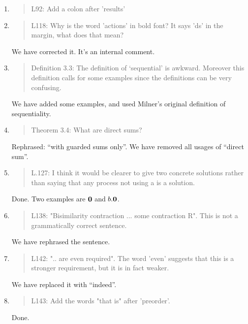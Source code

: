 \begin{enumerate}
\item \begin{quote}
    L92: Add a colon after 'results'
  \end{quote}

\item \begin{quote}
    L118: Why is the word 'actions' in bold font? It says 'ds' in the margin, what does that mean?
  \end{quote}
  We have corrected it. It's an internal comment.
  
\item \begin{quote}
Definition 3.3: The definition of ‘sequential’ is awkward.  Moreover
this definition calls for some examples since the definitions can be
very confusing.
\end{quote}
We have added some examples, and used Milner's original definition of sequentiality.
 
\item \begin{quote}
Theorem 3.4: What are direct sums?
\end{quote}
Rephrased: ``with guarded sums only''. We have removed all usages of
``direct sum''.

\item \begin{quote}
    L.127: I think it would be clearer to give two concrete solutions
    rather than saying that any process not using a is a solution.
  \end{quote}
  Done. Two examples are ${\boldsymbol 0}$ and $b.{\boldsymbol 0}$.
  
\item \begin{quote}
    L138: "Bisimilarity contraction ... some contraction R". This is not a grammatically correct sentence.
  \end{quote}
  We have rephrased the sentence.
  
\item \begin{quote}
    L142: ".. are even required". The word 'even' suggests that this
    is a stronger requirement, but it is in fact weaker.
  \end{quote}
  We have replaced it with ``indeed''.
  
\item \begin{quote}
    L143: Add the words "that is" after 'preorder'.
  \end{quote}
  Done.
  

\end{enumerate}
